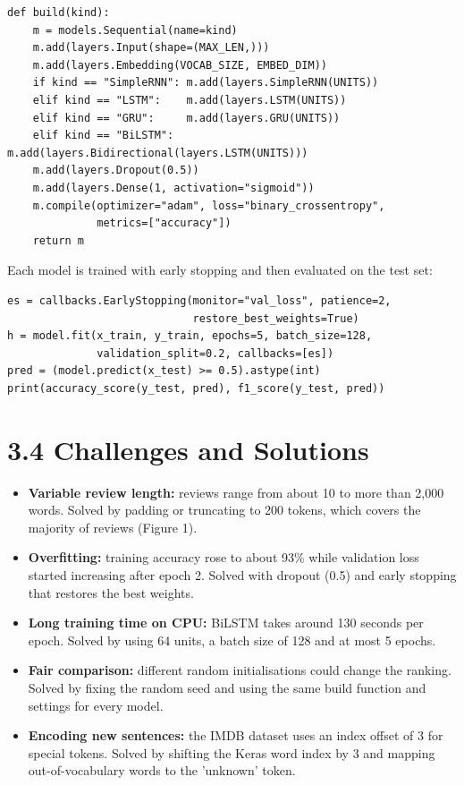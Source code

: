 \documentclass[12pt,a4paper,oneside]{report}
\begin{document}
\begin{lstlisting}
def build(kind):
    m = models.Sequential(name=kind)
    m.add(layers.Input(shape=(MAX_LEN,)))
    m.add(layers.Embedding(VOCAB_SIZE, EMBED_DIM))
    if kind == "SimpleRNN": m.add(layers.SimpleRNN(UNITS))
    elif kind == "LSTM":    m.add(layers.LSTM(UNITS))
    elif kind == "GRU":     m.add(layers.GRU(UNITS))
    elif kind == "BiLSTM":  m.add(layers.Bidirectional(layers.LSTM(UNITS)))
    m.add(layers.Dropout(0.5))
    m.add(layers.Dense(1, activation="sigmoid"))
    m.compile(optimizer="adam", loss="binary_crossentropy",
              metrics=["accuracy"])
    return m
\end{lstlisting}
Each model is trained with early stopping and then evaluated on the test set:

\begin{lstlisting}
es = callbacks.EarlyStopping(monitor="val_loss", patience=2,
                             restore_best_weights=True)
h = model.fit(x_train, y_train, epochs=5, batch_size=128,
              validation_split=0.2, callbacks=[es])
pred = (model.predict(x_test) >= 0.5).astype(int)
print(accuracy_score(y_test, pred), f1_score(y_test, pred))
\end{lstlisting}
\section*{3.4 Challenges and Solutions}
\begin{itemize}
\item \textbf{Variable review length:} reviews range from about 10 to more than 2,000 words. Solved by padding or truncating to 200 tokens, which covers the majority of reviews (Figure 1).
\item \textbf{Overfitting:} training accuracy rose to about 93\% while validation loss started increasing after epoch 2. Solved with dropout (0.5) and early stopping that restores the best weights.
\item \textbf{Long training time on CPU:} BiLSTM takes around 130 seconds per epoch. Solved by using 64 units, a batch size of 128 and at most 5 epochs.
\item \textbf{Fair comparison:} different random initialisations could change the ranking. Solved by fixing the random seed and using the same build function and settings for every model.
\item \textbf{Encoding new sentences:} the IMDB dataset uses an index offset of 3 for special tokens. Solved by shifting the Keras word index by 3 and mapping out-of-vocabulary words to the 'unknown' token.
\end{itemize}
\end{document}
